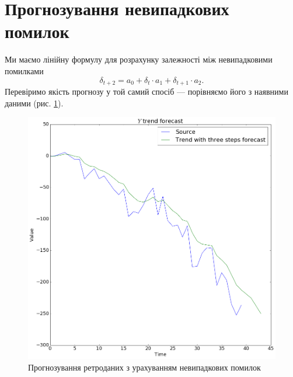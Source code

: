 
\section{Прогнозування невипадкових помилок}
Ми маємо лінійну формулу для розрахунку залежності
між невипадковими помилками
\begin{equation*}
  \delta_{t + 2} = a_0 + \delta_{t} \cdot a_1 + \delta_{t + 1} \cdot  a_2.
\end{equation*}
Перевіримо якість прогнозу у той самий спосіб ---
порівняємо його з наявними даними (рис. \ref{fig:forecast:errors}).
\begin{figure}[h!]
  \centering
  \includegraphics[width=\textwidth]{Coursework_files/Coursework_42_0.png}
  \caption{Прогнозування ретроданих з урахуванням невипадкових помилок}
  \label{fig:forecast:errors}
\end{figure}

